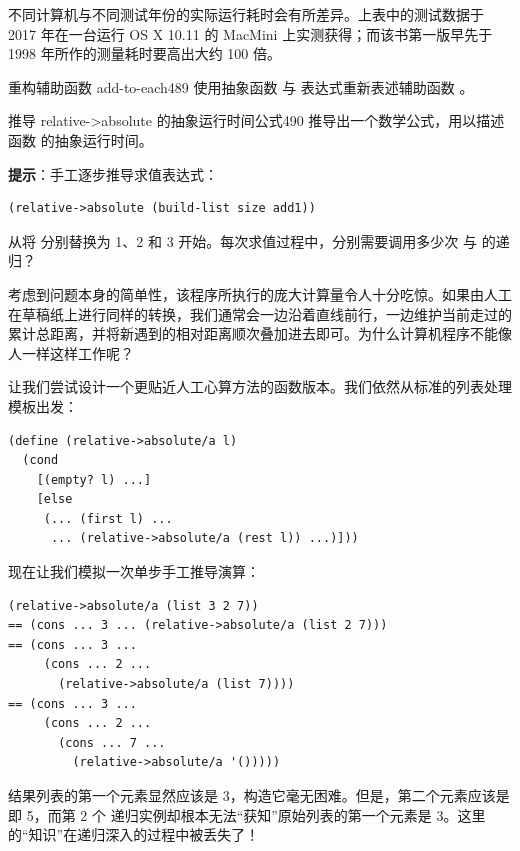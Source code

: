 \begin{notebox}[关于测量耗时的说明]
不同计算机与不同测试年份的实际运行耗时会有所差异。上表中的测试数据于 2017 年在一台运行 OS X 10.11 的 MacMini 上实测获得；而该书第一版早先于 1998 年所作的测量耗时要高出大约 100 倍。
\end{notebox}

\begin{exercise}{重构辅助函数 add-to-each}{489}
使用抽象函数  与  表达式重新表述辅助函数 。
\end{exercise}

\begin{exercise}{推导 relative->absolute 的抽象运行时间公式}{490}
推导出一个数学公式，用以描述函数  的抽象运行时间。

\textbf{提示}：手工逐步推导求值表达式：
\begin{lstlisting}[language=BSL]
(relative->absolute (build-list size add1))
\end{lstlisting}
从将  分别替换为 1、2 和 3 开始。每次求值过程中，分别需要调用多少次  与  的递归？
\end{exercise}

考虑到问题本身的简单性，该程序所执行的庞大计算量令人十分吃惊。如果由人工在草稿纸上进行同样的转换，我们通常会一边沿着直线前行，一边维护当前走过的累计总距离，并将新遇到的相对距离顺次叠加进去即可。为什么计算机程序不能像人一样这样工作呢？

让我们尝试设计一个更贴近人工心算方法的函数版本。我们依然从标准的列表处理模板出发：

\begin{lstlisting}[language=BSL]
(define (relative->absolute/a l)
  (cond
    [(empty? l) ...]
    [else
     (... (first l) ...
      ... (relative->absolute/a (rest l)) ...)]))
\end{lstlisting}

现在让我们模拟一次单步手工推导演算：

\begin{lstlisting}[language=BSL]
  (relative->absolute/a (list 3 2 7))
== (cons ... 3 ... (relative->absolute/a (list 2 7)))
== (cons ... 3 ...
     (cons ... 2 ...
       (relative->absolute/a (list 7))))
== (cons ... 3 ...
     (cons ... 2 ...
       (cons ... 7 ...
         (relative->absolute/a '()))))
\end{lstlisting}

结果列表的第一个元素显然应该是 3，构造它毫无困难。但是，第二个元素应该是  即 5，而第 2 个  递归实例却根本无法“获知”原始列表的第一个元素是 3。这里的“知识”在递归深入的过程中被丢失了！

